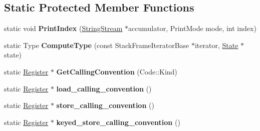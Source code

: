 \subsection*{Static Protected Member Functions}
\begin{DoxyCompactItemize}
\item 
static void {\bfseries Print\+Index} (\hyperlink{classv8_1_1internal_1_1_string_stream}{String\+Stream} $\ast$accumulator, Print\+Mode mode, int index)\hypertarget{classv8_1_1internal_1_1_b_a_s_e___e_m_b_e_d_d_e_d_af74e6c791e66578e8a3bc7114f78a24e}{}\label{classv8_1_1internal_1_1_b_a_s_e___e_m_b_e_d_d_e_d_af74e6c791e66578e8a3bc7114f78a24e}

\item 
static Type {\bfseries Compute\+Type} (const Stack\+Frame\+Iterator\+Base $\ast$iterator, \hyperlink{structv8_1_1internal_1_1_b_a_s_e___e_m_b_e_d_d_e_d_1_1_state}{State} $\ast$state)\hypertarget{classv8_1_1internal_1_1_b_a_s_e___e_m_b_e_d_d_e_d_a21892d61832ee18aa701fb863e990791}{}\label{classv8_1_1internal_1_1_b_a_s_e___e_m_b_e_d_d_e_d_a21892d61832ee18aa701fb863e990791}

\item 
static \hyperlink{structv8_1_1internal_1_1_register}{Register} $\ast$ {\bfseries Get\+Calling\+Convention} (Code\+::\+Kind)\hypertarget{classv8_1_1internal_1_1_b_a_s_e___e_m_b_e_d_d_e_d_a998bc2a7b7d5db2be30a4cbe4a56d7b1}{}\label{classv8_1_1internal_1_1_b_a_s_e___e_m_b_e_d_d_e_d_a998bc2a7b7d5db2be30a4cbe4a56d7b1}

\item 
static \hyperlink{structv8_1_1internal_1_1_register}{Register} $\ast$ {\bfseries load\+\_\+calling\+\_\+convention} ()\hypertarget{classv8_1_1internal_1_1_b_a_s_e___e_m_b_e_d_d_e_d_a3f3979baafbb40b495726d30f1e96591}{}\label{classv8_1_1internal_1_1_b_a_s_e___e_m_b_e_d_d_e_d_a3f3979baafbb40b495726d30f1e96591}

\item 
static \hyperlink{structv8_1_1internal_1_1_register}{Register} $\ast$ {\bfseries store\+\_\+calling\+\_\+convention} ()\hypertarget{classv8_1_1internal_1_1_b_a_s_e___e_m_b_e_d_d_e_d_a74de65ac0b5050ffe1f524ce9cc1b572}{}\label{classv8_1_1internal_1_1_b_a_s_e___e_m_b_e_d_d_e_d_a74de65ac0b5050ffe1f524ce9cc1b572}

\item 
static \hyperlink{structv8_1_1internal_1_1_register}{Register} $\ast$ {\bfseries keyed\+\_\+store\+\_\+calling\+\_\+convention} ()\hypertarget{classv8_1_1internal_1_1_b_a_s_e___e_m_b_e_d_d_e_d_a820d1d6b86ae60edf53db7f28235ef71}{}\label{classv8_1_1internal_1_1_b_a_s_e___e_m_b_e_d_d_e_d_a820d1d6b86ae60edf53db7f28235ef71}


\end{DoxyCompactItemize}
